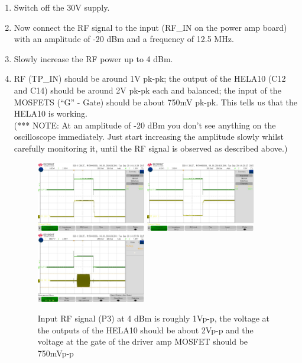 \begin{enumerate}
	\item Switch off the 30V supply.
	\item Now connect the RF signal to the input (RF\_IN on the power amp board) with an amplitude of -20 dBm and a frequency of 12.5 MHz.
	\item Slowly increase the RF power up to 4 dBm.
	\item RF (TP\_IN) should be around 1V pk-pk; the output of the HELA10 (C12 and C14) should be around 2V pk-pk each and balanced; the input of the MOSFETS (“G” - Gate) should be about 750mV pk-pk. This tells us that the HELA10 is working.\\
(*** NOTE: At an amplitude of -20 dBm you don’t see anything on the oscilloscope immediately. Just start increasing the amplitude slowly whilst carefully monitoring it, until the RF signal is observed as described above.)
		\begin{figure}[H]
			\centering
			\includegraphics[width=0.45\textwidth]{images/hardware/signal_15.jpg}
			\includegraphics[width=0.45\textwidth]{images/hardware/signal_16.jpg}
			\includegraphics[width=0.45\textwidth]{images/hardware/signal_17.jpg}
			\caption{Input RF signal (P3) at 4 dBm is roughly 1Vp-p, the voltage at the outputs of the HELA10 should be about 2Vp-p and the voltage at the gate of the driver amp MOSFET should be 750mVp-p}
			\label{fig:hw_amp_signals_3}

\end{figure}
\end{enumerate}

